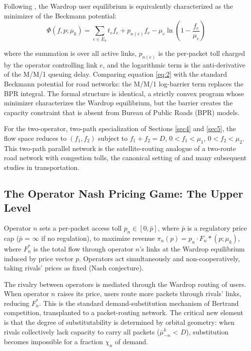 \documentclass[review,3p,authoryear]{elsarticle}
\begin{document}
Following \cite{beckmann1956studies}, the Wardrop user equilibrium is equivalently characterized as the minimizer of the Beckmann potential:
\begin{equation}
    \Phi(f,p; \mu_k) = \sum_{e \in E_k} t_e f_e + p_{n(e)} f_e - \mu_e \ln \left(1 - \frac{f_e}{\mu_e}\right)
    \label{eq:2}
\end{equation}

where the summation is over all active links, $p_{n(e)}$ is the per-packet toll charged by the operator controlling link $e$, and the logarithmic term is the anti-derivative of the M/M/1 queuing delay. Comparing equation \eqref{eq:2} with the standard Beckmann potential for road networks: the M/M/1 log-barrier term replaces the BPR integral. The formal structure is identical, a strictly convex program whose minimizer characterizes the Wardrop equilibrium, but the barrier creates the capacity constraint that is absent from Bureau of Public Roads (BPR) models.

For the two-operator, two-path specialization of Sections \ref{sec4} and \ref{sec5}, the flow space reduces to $(f_{1}, f_{2})$ subject to $f_{1} + f_{2} = D$, $0 < f_{1} < {\mu}_{1}$, $0 < f_{2} < {\mu}_{2}$. This two-path parallel network is the satellite-routing analogue of a two-route road network with congestion tolls, the canonical setting of \cite{Pigou1920} and many subsequent studies in transportation.

\subsection{The Operator Nash Pricing Game: The Upper Level}

Operator $n$ sets a per-packet access toll $p_{n} {\in} [0, \bar{p}]$, where \ensuremath{\bar{p}} is a regulatory price cap (\ensuremath{\bar{p}} = \ensuremath{\infty} if no regulation), to maximize revenue ${\pi}_{n}(p) = p_n {\cdot} F_n*(p; {\mu}_k)$, where $F_{n}^{*}$ is the total flow through operator $n$'s links at the Wardrop equilibrium induced by price vector $p$. Operators act simultaneously and non-cooperatively, taking rivals' prices as fixed (Nash conjecture).

The rivalry between operators is mediated through the Wardrop routing of users. When operator $n$ raises its price, users route more packets through rivals' links, reducing $F_{n}^{*}$. This is the standard demand-substitution mechanism of Bertrand competition, transplanted to a packet-routing network. The critical new element is that the degree of substitutability is determined by orbital geometry: when rivals collectively lack capacity to carry all packets ($\ensuremath{\bar{{\mu}}}_{-n}^{k}$ < $D$), substitution becomes impossible for a fraction ${\chi}_{n}$ of demand.
\end{document}
